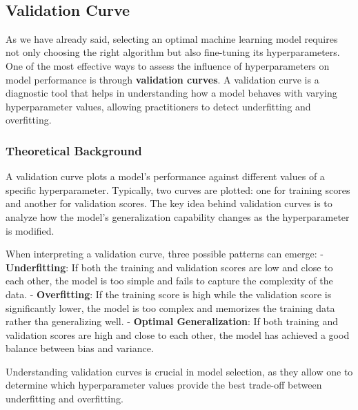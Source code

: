 \documentclass{article}
\begin{document}
    \begin{center}
    \end{center}
    { \hspace*{\fill} \\}
    
    \subsection{Validation Curve}\label{validation-curve}

    As we have already said, selecting an optimal machine learning model
requires not only choosing the right algorithm but also fine-tuning its
hyperparameters. One of the most effective ways to assess the influence
of hyperparameters on model performance is through \textbf{validation
curves}. A validation curve is a diagnostic tool that helps in
understanding how a model behaves with varying hyperparameter values,
allowing practitioners to detect underfitting and overfitting.

\subsubsection{Theoretical Background}\label{theoretical-background}

A validation curve plots a model's performance against different values
of a specific hyperparameter. Typically, two curves are plotted: one for
training scores and another for validation scores. The key idea behind
validation curves is to analyze how the model's generalization
capability changes as the hyperparameter is modified.

When interpreting a validation curve, three possible patterns can
emerge: - \textbf{Underfitting}: If both the training and validation
scores are low and close to each other, the model is too simple and
fails to capture the complexity of the data. - \textbf{Overfitting}: If
the training score is high while the validation score is significantly
lower, the model is too complex and memorizes the training data rather
tha generalizing well. - \textbf{Optimal Generalization}: If both
training and validation scores are high and close to each other, the
model has achieved a good balance between bias and variance.

Understanding validation curves is crucial in model selection, as they
allow one to determine which hyperparameter values provide the best
trade-off between underfitting and overfitting.
\end{document}
